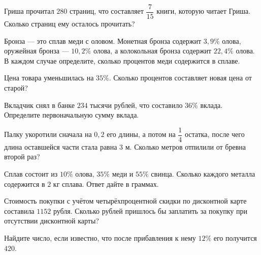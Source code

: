 \begin{class}[number=2]
	\begin{listofex}
		\item Гриша прочитал \(280\) страниц, что составляет \(\dfrac{7}{15}\) книги, которую читает Гриша. Сколько страниц ему осталось прочитать?
		\item Бронза --- это сплав меди с оловом. Монетная бронза содержит \(3,9 \% \) олова, оружейная бронза --- \(10,2 \%\) олова, а колокольная бронза содержит \(22,4 \% \) олова. В каждом случае определите, сколько процентов меди содержится в сплаве.
		\item Цена товара уменьшилась на \(35 \%\). Сколько процентов составляет новая цена от старой?
		\item Вкладчик снял в банке \(234\) тысячи рублей, что составило \(36 \%\) вклада. Определите первоначальную сумму вклада.
		\item Палку укоротили сначала на \(0,2\) его длины, а потом на \(\dfrac{1}{4}\)  остатка, после чего длина оставшейся части стала равна \(3\) м. Сколько метров отпилили от бревна второй раз?
		\item Сплав состоит из \(10 \%\) олова, \(35\%\) меди и \(55\%\) свинца. Сколько каждого металла содержится в \(2\) кг сплава. Ответ дайте в граммах.
		\item Стоимость покупки с учётом четырёхпроцентной скидки по дисконтной карте составила \(1152\) рубля. Сколько рублей пришлось бы заплатить за покупку при отсутствии дисконтной карты?
		\item Найдите число, если известно, что после прибавления к нему \(12\%\) его получится \(420\).
	\end{listofex}
\end{class}


